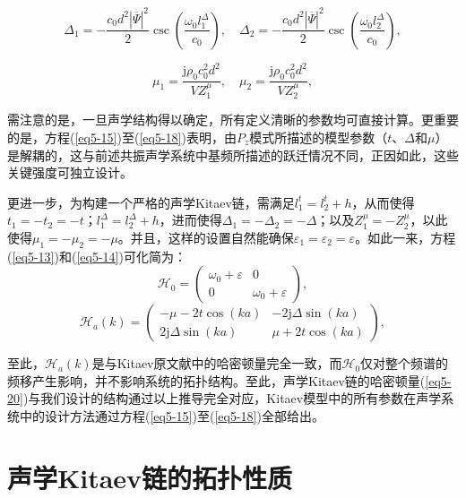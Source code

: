 \begin{equation}\label{eq5-17}
    \Delta_1 = -\frac{c_0d^2|\overline{\Psi}|^2}{2}\csc\left(\frac{\omega_0l_1^{\Delta}}{c_0}\right), \quad \Delta_2 = -\frac{c_0d^2|\overline{\Psi}|^2}{2}\csc\left(\frac{\omega_0l_2^{\Delta}}{c_0}\right),
\end{equation}
    
\begin{equation}\label{eq5-18}
    \mu_1 = \frac{\mathrm{j}\rho_0c_0^2d^2}{VZ_1^{\mu}}, \quad \mu_2 = \frac{\mathrm{j}\rho_0c_0^2d^2}{VZ_2^{\mu}},
\end{equation}

需注意的是，一旦声学结构得以确定，所有定义清晰的参数均可直接计算。更重要的是，方程(\ref{eq5-15})至(\ref{eq5-18})表明，由$P_z$模式所描述的模型参数（$t$、$\Delta$和$\mu$）是解耦的，这与前述共振声学系统中基频所描述的跃迁情况不同，正因如此，这些关键强度可独立设计。

更进一步，为构建一个严格的声学Kitaev链，需满足$l_1^t = l_2^t + h$，从而使得$t_1 = -t_2 = -t$；$l_1^{\Delta} = l_2^{\Delta} + h$，进而使得$\Delta_1 = -\Delta_2 = -\Delta$；以及$Z_1^{\mu} = -Z_2^{\mu}$，以此使得$\mu_1 = -\mu_2 = -\mu$。并且，这样的设置自然能确保$\varepsilon_1 = \varepsilon_2 = \varepsilon$。如此一来，方程(\ref{eq5-13})和(\ref{eq5-14})可化简为：
\begin{equation}\label{eq5-19}
    \mathcal{H}_0 = 
    \begin{pmatrix}
    \omega_0 + \varepsilon & 0 \\
    0 & \omega_0 + \varepsilon
    \end{pmatrix},
\end{equation}
\begin{equation}\label{eq5-20}
    \mathcal{H}_a(k) = 
    \begin{pmatrix}
    -\mu - 2t\cos(ka) & -2\mathrm{j}\Delta\sin(ka) \\
    2\mathrm{j}\Delta\sin(ka) & \mu + 2t\cos(ka)
    \end{pmatrix},
\end{equation}

至此，$\mathcal{H}_a(k)$是与Kitaev原文献中的哈密顿量完全一致\cite{r4}，而$\mathcal{H}_0$仅对整个频谱的频移产生影响，并不影响系统的拓扑结构。至此，声学Kitaev链的哈密顿量(\ref{eq5-20})与我们设计的结构通过以上推导完全对应，Kitaev模型中的所有参数在声学系统中的设计方法通过方程(\ref{eq5-15})至(\ref{eq5-18})全部给出。

\section{声学Kitaev链的拓扑性质}

